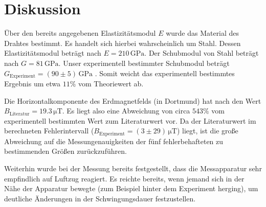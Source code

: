 \section{Diskussion}
\label{sec:Diskussion}
Über den bereits angegebenen Elastizitätsmodul $E$ wurde das Material des Drahtes bestimmt.
Es handelt sich hierbei wahrscheinlich um Stahl. Dessen Elastizitätsmodul beträgt nach \cite{stahlharteJungs} $E=210 \,\si{\giga\pascal}$.
Der Schubmodul von Stahl beträgt nach \cite{stahlharteJungs} $G=81 \,\si{\giga\pascal}$. Unser experimentell bestimmter Schubmodul beträgt $G_{\mathrm{Experiment}}=(90 \pm 5) \,\si{\giga\pascal}$ .
Somit weicht das experimentell bestimmtes Ergebnis um etwa $11\%$ vom Theoriewert ab.

Die Horizontalkomponente des Erdmagnetfelds (in Dortmund) hat nach \cite{Potsdam} den Wert
$B_{\mathrm{Literatur}}=19.3 \,\si{\micro\tesla}$.
Es liegt also eine Abweichung von circa $543\%$ vom experimentell bestimmten Wert
zum Literaturwert vor. Da der Literaturwert im berechneten Fehlerintervall ($B_{\mathrm{Experiment}}=(3\pm29)\,\si{\micro\tesla}$) liegt, ist die große Abweichung auf die Messungenauigkeiten
der fünf fehlerbehafteten zu bestimmenden Größen zurückzuführen.

Weiterhin wurde bei der Messung bereits festgestellt, dass die Messapparatur sehr empfindlich auf Luftzug reagiert. Es reichte bereits,
wenn jemand sich in der Nähe der Apparatur bewegte (zum Beispiel hinter dem Experiment herging), um deutliche Änderungen in der Schwingungsdauer festzustellen.
